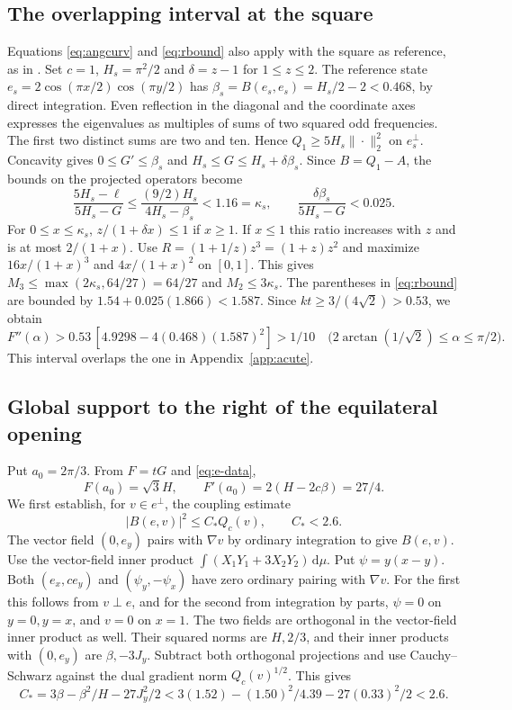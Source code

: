 \documentclass[11pt,a4paper,reqno]{amsart}
\theoremstyle{remark}
\numberwithin{equation}{section}
\newcommand{\dd}{\,\mathrm d}
\begin{document}
\subsection{The overlapping interval at the square}\label{sec:square}
Equations \eqref{eq:angcurv} and \eqref{eq:rbound} also apply with the
square as reference, as in \cite[Appendix~S1]{wang}. Set $c=1$,
$H_s=\pi^2/2$ and $\delta=z-1$ for $1\le z\le2$. The reference state
$e_s=2\cos(\pi x/2)\cos(\pi y/2)$ has
$\beta_s=B(e_s,e_s)=H_s/2-2<0.468$, by direct integration. Even reflection
in the diagonal and the coordinate axes expresses the eigenvalues as
multiples of sums of two squared odd frequencies. The first two distinct
sums are two and ten. Hence $Q_1\ge5H_s\|\cdot\|_2^2$ on $e_s^\perp$.
Concavity gives $0\le G'\le\beta_s$ and $H_s\le G\le H_s+\delta\beta_s$.
Since $B=Q_1-A$, the bounds on the projected operators become
\[
 \frac{5H_s-\ell}{5H_s-G}\le\frac{(9/2)H_s}{4H_s-\beta_s}<1.16=\kappa_s,
 \qquad \frac{\delta\beta_s}{5H_s-G}<0.025 .
\]
For $0\le x\le\kappa_s$, $z/(1+\delta x)\le1$ if $x\ge1$. If $x\le1$ this
ratio increases with $z$ and is at most $2/(1+x)$. Use
$R=(1+1/z)z^3=(1+z)z^2$ and maximize $16x/(1+x)^3$ and $4x/(1+x)^2$ on
$[0,1]$. This gives $M_3\le\max(2\kappa_s,64/27)=64/27$ and
$M_2\le3\kappa_s$. The parentheses in \eqref{eq:rbound} are bounded by
$1.54+0.025(1.866)<1.587$. Since $kt\ge3/(4\sqrt2)>0.53$, we obtain
\[
 F''(\alpha)>0.53\,[4.9298-4(0.468)(1.587)^2]>1/10
 \quad\bigl(2\arctan(1/\sqrt2)\le\alpha\le\pi/2\bigr).
\]
This interval overlaps the one in Appendix~\ref{app:acute}.

\subsection{Global support to the right of the equilateral opening}
Put $a_0=2\pi/3$. From $F=tG$ and \eqref{eq:e-data},
\[
             F(a_0)=\sqrt3 H,\qquad
             F'(a_0)=2(H-2c\beta)=27/4 .
\]
We first establish, for $v\in e^\perp$, the coupling estimate
\begin{equation}\label{eq:stream}
              |B(e,v)|^2\le C_* Q_c(v),\qquad C_*<2.6 .
\end{equation}
The vector field $(0,e_y)$ pairs with $\nabla v$ by ordinary integration to
give $B(e,v)$. Use the vector-field inner product
$\int(X_1Y_1+3X_2Y_2)\dd\mu$. Put $\psi=y(x-y)$. Both $(e_x,ce_y)$ and
$(\psi_y,-\psi_x)$ have zero ordinary pairing with $\nabla v$. For the
first this follows from $v\perp e$, and for the second from integration by
parts, $\psi=0$ on $y=0,y=x$, and $v=0$ on $x=1$. The two fields are
orthogonal in the vector-field inner product as well. Their squared norms
are $H,2/3$, and their inner products with $(0,e_y)$ are $\beta,-3J_y$.
Subtract both orthogonal projections and use Cauchy--Schwarz against the
dual gradient norm $Q_c(v)^{1/2}$. This gives
\[
 C_* =3\beta-\beta^2/H-27J_y^2/2
 <3(1.52)-(1.50)^2/4.39-27(0.33)^2/2<2.6 .
\]
\end{document}
